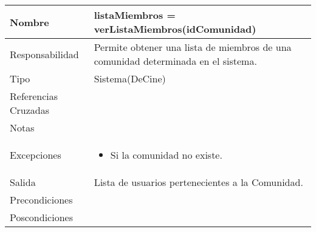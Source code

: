 \documentclass{article}
\begin{document}
\begin{table}[h]
\begin{tabular}{|l|l|l|l|l|l|}
\hline
\multicolumn{2}{|p{3cm}|}{Nombre} & \multicolumn{4}{p{10cm}|}{\textbf{listaMiembros = verListaMiembros(idComunidad)}}\\
\hline
\multicolumn{2}{|p{3cm}|}{Responsabilidad} & \multicolumn{4}{p{10cm}|}{Permite  obtener una lista de miembros de una comunidad determinada en el sistema.} \\
\hline
\multicolumn{2}{|p{3cm}|}{Tipo} & \multicolumn{4}{p{10cm}|}{Sistema(DeCine)} \\
\hline
\multicolumn{2}{|p{3cm}|}{Referencias Cruzadas} & \multicolumn{4}{p{10cm}|}{} \\
\hline
\multicolumn{2}{|p{3cm}|}{Notas} & \multicolumn{4}{p{10cm}|}{} \\
\hline
\multicolumn{2}{|p{3cm}|}{Excepciones} & \multicolumn{4}{p{10cm}|}{\begin{itemize}
\item Si la comunidad no existe.
\end{itemize}} \\
\hline
\multicolumn{2}{|p{3cm}|}{Salida} & \multicolumn{4}{p{10cm}|}{Lista de usuarios pertenecientes a la Comunidad.} \\
\hline
\multicolumn{2}{|p{3cm}|}{Precondiciones} & \multicolumn{4}{p{10cm}|}{} \\
\hline
\multicolumn{2}{|p{3cm}|}{Poscondiciones} & \multicolumn{4}{p{10cm}|}{} \\
\hline
\end{tabular}
\end{table}
\end{document}
